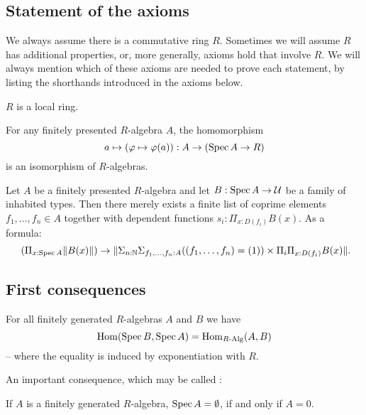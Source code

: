 \subsection{Statement of the axioms}
We always assume there is a commutative ring $R$.
Sometimes we will assume $R$ has additional properties, or, more generally,
axioms hold that involve $R$.
We will always mention which of these axioms are needed to prove each statement,
by listing the shorthands introduced in the axioms below.

\begin{axiom}[Loc]%
  \label{loc}
  $R$ is a local ring.
\end{axiom}

\begin{axiom}[SQC]%
  \label{sqc}
  For any finitely presented $R$-algebra $A$, the homomorphism
  \[ a \mapsto (\varphi\mapsto \varphi(a)) : A \to (\operatorname{Spec} A \to R)\]
  is an isomorphism of $R$-algebras.
\end{axiom}

\begin{axiom}[Z-choice]%
  \label{Z-choice}
  Let $A$ be a finitely presented $R$-algebra
  and let $B : \operatorname{Spec} A \to \mathcal{U}$ be a family of inhabited types.
  Then there merely exists
  a finite list of coprime elements $f_1, \dots, f_n \in A$
  together with dependent functions $s_i : \Pi_{x : D(f_i)} B(x)$.
  As a formula:
  \[ (\Pi_{x : \Spec A} \propTrunc{B(x)}) \to
     \propTrunc{ \Sigma_{n : \N} \Sigma_{f_1, \dots, f_n : A}
      ((f_1, \dots, f_n) = (1)) \times
      \Pi_i \Pi_{x : D(f_i)} B(x) }
     \rlap{.}
  \]
\end{axiom}

\subsection{First consequences}

\begin{proposition}%
  \label{spec-embedding}
  For all finitely generated $R$-algebras $A$ and $B$ we have
  \[ \mathrm{Hom}(\operatorname{Spec} B, \operatorname{Spec} A)=\mathrm{Hom}_{R\text{-}\mathrm{Alg}}(A,B)\]
  -- where the equality is induced by exponentiation with $R$.
\end{proposition}

An important consequence, which may be called :

\begin{proposition}%
  \label{weak-nullstellensatz}
  If $A$ is a finitely generated $R$-algebra, $\operatorname{Spec} A=\emptyset$, if and only if $A=0$.
\end{proposition}

